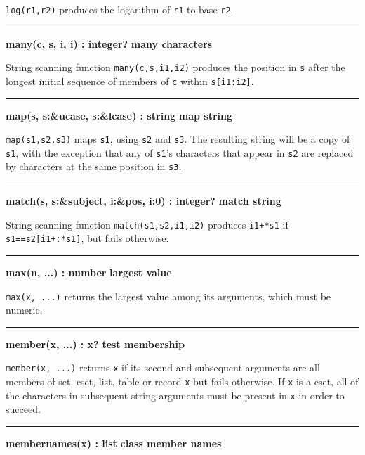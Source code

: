 \noindent
{}\texttt{log(r1,r2)} produces the logarithm of
\texttt{r1} to base \texttt{r2}.

\bigskip\hrule\vspace{0.1cm}
\noindent
{\bf many(c, s, i, i) : integer? } \hfill {\bf many characters}

\noindent
{}String scanning function \texttt{many(c,s,i1,i2)} produces
the position in \texttt{s} after the longest initial sequence of
members of \texttt{c} within \texttt{s[i1:i2]}.

\bigskip\hrule\vspace{0.1cm}
\noindent
{\bf map(s, s:\&ucase, s:\&lcase) : string } \hfill {\bf map string}

\noindent
{}\texttt{map(s1,s2,s3)} maps \texttt{s1}, using
\texttt{s2} and \texttt{s3}. The resulting string will be a copy of
\texttt{s1}, with the exception that any of
\texttt{s1}'s characters that appear in \texttt{s2}
are replaced by characters at the same position in \texttt{s3}.

\bigskip\hrule\vspace{0.1cm}
\noindent
{\bf match(s, s:\&subject, i:\&pos, i:0) : integer? } \hfill {\bf match string}

\noindent
{}String scanning function \texttt{match(s1,s2,i1,i2)}
produces \texttt{i1+*s1} if \texttt{s1==s2[i1+:*s1]}, but fails
otherwise.

\bigskip\hrule\vspace{0.1cm}
\noindent
{\bf max(n, ...) : number } \hfill {\bf largest value}

\noindent
{}\texttt{max(x, ...)} returns the largest value among its
arguments, which must be numeric.

\bigskip\hrule\vspace{0.1cm}
\noindent
{\bf member(x, ...) : x? } \hfill {\bf test membership}

\noindent
{}\texttt{member(x, ...)} returns \texttt{x} if its second
and subsequent arguments are all members of set, cset, list, table or record
\texttt{x} but fails otherwise. If \texttt{x} is a cset, all of the
characters in subsequent string arguments must be present in \texttt{x}
in order to succeed.

\bigskip\hrule\vspace{0.1cm}
\noindent
{\bf membernames(x) : list } \hfill {\bf class member names}

